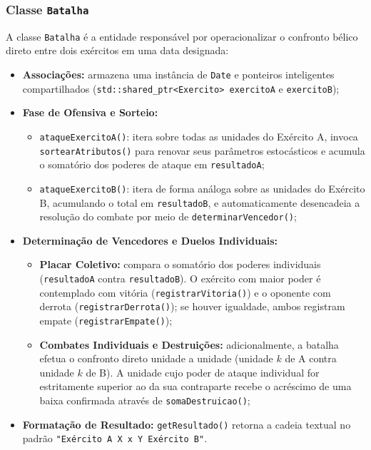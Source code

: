 \documentclass[12pt,a4paper]{article}
\begin{document}
\subsubsection{Classe \texttt{Batalha}}
A classe \texttt{Batalha} é a entidade responsável por operacionalizar o confronto bélico direto entre dois exércitos em uma data designada:
\begin{itemize}
    \item \textbf{Associações:} armazena uma instância de \texttt{Date} e ponteiros inteligentes compartilhados (\texttt{std::shared\_ptr<Exercito> exercitoA} e \texttt{exercitoB});
    \item \textbf{Fase de Ofensiva e Sorteio:}
    \begin{itemize}
        \item \texttt{ataqueExercitoA()}: itera sobre todas as unidades do Exército A, invoca \texttt{sortearAtributos()} para renovar seus parâmetros estocásticos e acumula o somatório dos poderes de ataque em \texttt{resultadoA};
        \item \texttt{ataqueExercitoB()}: itera de forma análoga sobre as unidades do Exército B, acumulando o total em \texttt{resultadoB}, e automaticamente desencadeia a resolução do combate por meio de \texttt{determinarVencedor()};
    \end{itemize}
    \item \textbf{Determinação de Vencedores e Duelos Individuais:}
    \begin{itemize}
        \item \textbf{Placar Coletivo:} compara o somatório dos poderes individuais (\texttt{resultadoA} contra \texttt{resultadoB}). O exército com maior poder é contemplado com vitória (\texttt{registrarVitoria()}) e o oponente com derrota (\texttt{registrarDerrota()}); se houver igualdade, ambos registram empate (\texttt{registrarEmpate()});
        \item \textbf{Combates Individuais e Destruições:} adicionalmente, a batalha efetua o confronto direto unidade a unidade (unidade $k$ de A contra unidade $k$ de B). A unidade cujo poder de ataque individual for estritamente superior ao da sua contraparte recebe o acréscimo de uma baixa confirmada através de \texttt{somaDestruicao()};
    \end{itemize}
    \item \textbf{Formatação de Resultado:} \texttt{getResultado()} retorna a cadeia textual no padrão \texttt{"Exército A X x Y Exército B"}.
\end{itemize}
\end{document}
